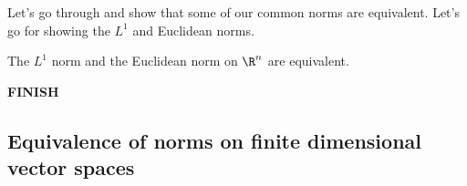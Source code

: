 \documentclass[class=article, crop=false]{standalone}
\begin{document}
Let's go through and show that some of our common norms are equivalent. Let's go for showing the $L^1$ and Euclidean norms.

\begin{fact}
    The $L^1$ norm and the Euclidean norm on $\R^n$ are equivalent.
\end{fact}
\begin{pf}
    \textbf{FINISH}
\end{pf}











\subsection{Equivalence of norms on finite dimensional vector spaces}
\end{document}
